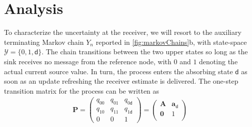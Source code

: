 \section{Analysis}
\label{sec:analysis}

To characterize the uncertainty at the receiver, we will resort to the auxiliary terminating Markov chain $Y_n$ reported in \figr\ref{fig:markovChains}b, with state-space $\mathcal Y = \{0,1,\mathsf d\}$. The chain transitions between the two upper states so long as the sink receives no message from the reference node, with $0$ and $1$ denoting the actual current source value. In turn, the process enters the absorbing state $\mathsf d$ as soon as an update refreshing the receiver estimate is delivered. 
The one-step transition matrix for the process can be written as
\begin{align}
    \mathbf P = 
    \left(
        \begin{array}{cc|c}
            q_{00}  & q_{01} & q_{0\mathsf d}\\  
            q_{10}  & q_{11} & q_{1\mathsf d}\\[.3em]
            \hline
            0       & 0      & 1
        \end{array}
    \right)
     =
    \begin{pmatrix}
        \mathbf A & \mathbf a_{\mathsf d}\\
        \mathbf 0 & 1 \\
    \end{pmatrix}
\end{align}
